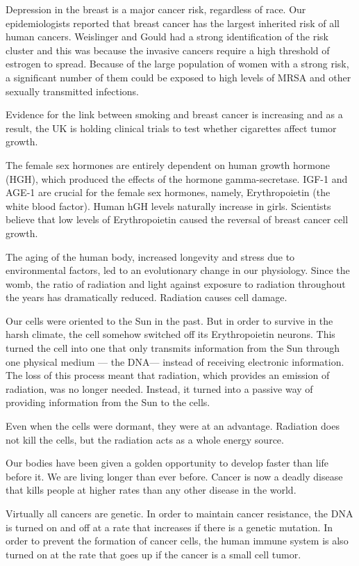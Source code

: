 \documentclass{article}
\begin{document}
Depression in the breast is a major cancer risk, regardless of race. Our epidemiologists reported that breast cancer has the largest inherited risk of all human cancers. Weislinger and Gould had a strong identification of the risk cluster and this was because the invasive cancers require a high threshold of estrogen to spread. Because of the large population of women with a strong risk, a significant number of them could be exposed to high levels of MRSA and other sexually transmitted infections.

Evidence for the link between smoking and breast cancer is increasing and as a result, the UK is holding clinical trials to test whether cigarettes affect tumor growth.

The female sex hormones are entirely dependent on human growth hormone (HGH), which produced the effects of the hormone gamma-secretase. IGF-1 and AGE-1 are crucial for the female sex hormones, namely, Erythropoietin (the white blood factor). Human hGH levels naturally increase in girls. Scientists believe that low levels of Erythropoietin caused the reversal of breast cancer cell growth.

The aging of the human body, increased longevity and stress due to environmental factors, led to an evolutionary change in our physiology. Since the womb, the ratio of radiation and light against exposure to radiation throughout the years has dramatically reduced. Radiation causes cell damage.

Our cells were oriented to the Sun in the past. But in order to survive in the harsh climate, the cell somehow switched off its Erythropoietin neurons. This turned the cell into one that only transmits information from the Sun through one physical medium — the DNA— instead of receiving electronic information. The loss of this process meant that radiation, which provides an emission of radiation, was no longer needed. Instead, it turned into a passive way of providing information from the Sun to the cells.

Even when the cells were dormant, they were at an advantage. Radiation does not kill the cells, but the radiation acts as a whole energy source.

Our bodies have been given a golden opportunity to develop faster than life before it. We are living longer than ever before. Cancer is now a deadly disease that kills people at higher rates than any other disease in the world.

Virtually all cancers are genetic. In order to maintain cancer resistance, the DNA is turned on and off at a rate that increases if there is a genetic mutation. In order to prevent the formation of cancer cells, the human immune system is also turned on at the rate that goes up if the cancer is a small cell tumor.
\end{document}
